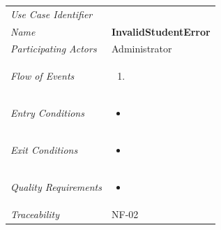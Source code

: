 \documentclass[12pt,letterpaper]{article}
\begin{document}
\begin{center}
	\begin{tabu} to 
		\toprule
		Use Case Identifier & \invalidstudenterror{} \\
		Name & {\bf InvalidStudentError} \\
		Participating Actors & Administrator \\
		Flow of Events & 
	    \begin{enumerate}[topsep=-1em,leftmargin=*]
		    \item 
		\end{enumerate} \\

		Entry Conditions &
		\begin{itemize}[topsep=-1em,leftmargin=*]
		    \item 
        \end{itemize} \\

		Exit Conditions &
		\begin{itemize}[topsep=-1em,leftmargin=*]
		    \item 
        \end{itemize} \\

		Quality Requirements &
		\begin{itemize}[topsep=-1em,leftmargin=*]
		    \item 
        \end{itemize} \\

		Traceability & NF-02 \\
		\toprule
	\end{tabu}
\end{center}
\end{document}
